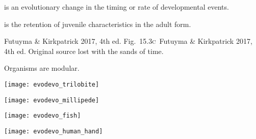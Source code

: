 \documentclass[t,handout]{beamer}  %
\newcommand{\futuyma}[1]{%
	\ifthenelse{\isempty{#1}}%
	{Futuyma \& Kirkpatrick 2017, 4th ed.}%
	{Fig.~#1~Futuyma \& Kirkpatrick 2017, 4th ed.}%
}
\newcommand{\backskip}{\vspace{-0.5\baselineskip}}
\begin{document}
\begin{frame}{ is an evolutionary change in the timing or rate of developmental events.}

\backskip

\begin{multicols}{2}
\hangpara {} is the retention of juvenile characteristics in the adult form.

\medskip

\centering


\columnbreak


\end{multicols}
	
\vfilll

\tiny\futuyma{15.3\textsc{c}}\hfill Original source lost with the sands of time.
	
\end{frame}


\begin{frame}{Organisms are modular.}
\vspace{-\baselineskip}

\begin{multicols}{2}

\centering

\texttt{[image: evodevo\_trilobite]}

\vspace{0.5ex}

\noindent\texttt{[image: evodevo\_millipede]}

\columnbreak

\noindent\texttt{[image: evodevo\_fish]}

\vspace{0.5ex}

\texttt{[image: evodevo\_human\_hand]}

\end{multicols}
	
\end{frame}

\end{document}

